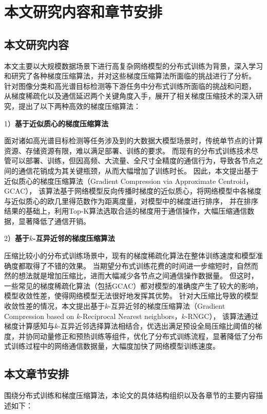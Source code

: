 \documentclass{xdupgthesis}
\begin{document}
\section{本文研究内容和章节安排}
\subsection{本文研究内容}
本文主要以大规模数据场景下进行高复杂网络模型的分布式训练为背景，深入学习和研究了各种梯度压缩算法，并对这些梯度压缩算法所面临的挑战进行了分析。
针对图像分类和高光谱目标检测等下游任务中分布式训练所面临的挑战和问题，
从梯度稀疏化以及通信延迟两个关键角度入手，展开了相关梯度压缩技术的深入研究，提出了以下两种高效的梯度压缩算法：

1）\textbf{基于近似质心的梯度压缩算法}

面对诸如高光谱目标检测等任务涉及到的大数据大模型场景时，传统单节点的计算资源、存储资源有限，难以满足部署、训练的要求。
而现有的分布式训练技术尽管可以部署、训练，但因高频、大流量、全尺寸全精度的通信行为，导致各节点之间的通信花销成为其关键瓶颈，从而大幅增加了训练时长。
因此，本文提出基于近似质心的梯度压缩算法（Gradient Compression via Approximate Centroid，GCAC），
该算法基于网络模型反向传播时梯度的近似质心，将网络模型中各梯度与近似质心的欧几里得范数作为距离度量，对模型中的梯度进行排序，
并在排序结果的基础上，利用Top-K算法选取合适的梯度用于通信操作，大幅压缩通信数据，显著降低了通信开销。

2）\textbf{基于$k$-互异近邻的梯度压缩算法}

压缩比较小的分布式训练场景中，现有的梯度稀疏化算法在整体训练速度和模型准确度都取得了不错的效果。
当期望分布式训练花费的时间进一步缩短时，自然而然的想法就是增加压缩比，进而大幅减少各节点之间通信操作数据量。
但这时，一些常见的梯度稀疏化算法（包括GCAC）都对模型的准确度产生了较大的影响，模型收敛性差，使得网络模型无法很好地发挥其优势。
针对大压缩比导致的模型收敛性差的情况，本文提出基于$k$-互异近邻的梯度压缩算法（Gradient Compression based on $k$-Reciprocal Nearest neighbors，$k$-RNGC），
该算法通过梯度计算感知与$k$-互异近邻选择算法相结合，优选出满足预设全局压缩比阈值的梯度，并协同动量修正和预热训练等组件，优化了分布式训练流程，显著降低了分布式训练过程中的网络通信数据量，大幅度加快了网络模型训练速度。

\subsection{本文章节安排}
围绕分布式训练和梯度压缩算法，本论文的具体结构组织以及各章节的主要内容描述如下：
\end{document}
